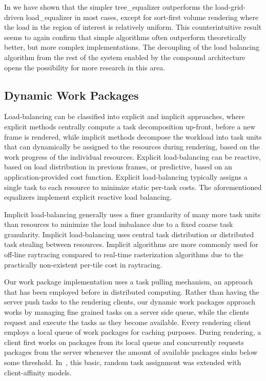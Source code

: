 In \cite{ESP:18} we have shown that the simpler \textsf{tree\_equalizer}
outperforms the load-grid-driven \textsf{load\_equalizer} in most cases, except
for sort-first volume rendering where the load in the region of interest is
relatively uniform. This counterintuitive result seems to again confirm that
simple algorithms often outperform theoretically better, but more complex
implementations. The decoupling of the load balancing algorithm from the rest of
the system enabled by the compound architecture opens the possibility for more
research in this area.

\subsection{Dynamic Work Packages}

Load-balancing can be classified into explicit and implicit approaches, where
explicit methods centrally compute a task decomposition up-front, before a new
frame is rendered, while implicit methods decompose the workload into task units
that can dynamically be assigned to the resources during rendering, based on the
work progress of the individual resources. Explicit load-balancing can be
reactive, based on load distribution in previous frames, or predictive, based on
an application-provided cost function. Explicit load-balancing typically assigns
a single task to each resource to minimize static per-task costs.  The
aforementioned equalizers implement explicit reactive load balancing.

Implicit load-balancing generally uses a finer granularity of many more task
units than resources to minimize the load imbalance due to a fixed coarse task
granularity. Implicit load-balancing uses central task distribution or
distributed task stealing between resources. Implicit algorithms are more
commonly used for off-line raytracing compared to real-time rasterization
algorithms due to the practically non-existent per-tile cost in raytracing.

Our work package implementation uses a task pulling mechanism, an approach that
has been employed before in distributed computing. Rather than having the server
push tasks to the rendering clients, our dynamic work packages approach works by
managing fine grained tasks on a server side queue, while the clients request
and execute the tasks as they become available. Every rendering client employs a
local queue of work packages for caching purposes. During rendering, a client
first works on packages from its local queue and concurrently requests packages
from the server whenever the amount of available packages sinks below some
threshold. In~\cite{SPEP:16}, this basic, random task
assignment was extended with client-affinity models.

